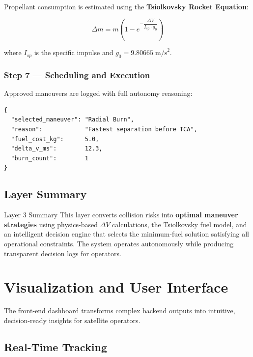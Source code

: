 \documentclass[11pt, a4paper]{article}
\begin{document}
Propellant consumption is estimated using the \textbf{Tsiolkovsky Rocket Equation}:

\[
  \Delta m = m \left(1 - e^{-\dfrac{\Delta V}{I_{sp} \cdot g_0}}\right)
\]

where $I_{sp}$ is the specific impulse and $g_0 = 9.80665\;\text{m/s}^2$.

\subsubsection{Step 7 --- Scheduling and Execution}

Approved maneuvers are logged with full autonomy reasoning:

\begin{lstlisting}[style=jsonstyle, caption={Maneuver Decision Log}]
{
  "selected_maneuver": "Radial Burn",
  "reason":            "Fastest separation before TCA",
  "fuel_cost_kg":      5.0,
  "delta_v_ms":        12.3,
  "burn_count":        1
}
\end{lstlisting}

\subsection{Layer Summary}

\begin{layerbox}[colframe=safegreen]{Layer 3 Summary}
This layer converts collision risks into \textbf{optimal maneuver strategies} using physics-based
$\Delta V$ calculations, the Tsiolkovsky fuel model, and an intelligent decision engine that
selects the minimum-fuel solution satisfying all operational constraints. The system operates
autonomously while producing transparent decision logs for operators.
\end{layerbox}

\section{Visualization and User Interface}

The front-end dashboard transforms complex backend outputs into intuitive,
decision-ready insights for satellite operators.

\subsection{Real-Time Tracking}
\end{document}
